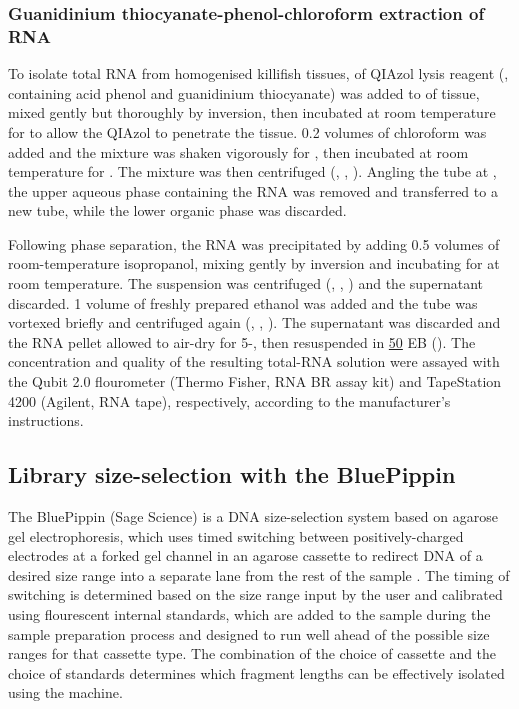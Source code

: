 \subsubsection{Guanidinium thiocyanate-phenol-chloroform extraction of RNA}
\label{sec:methods_molec_standard_qiazol}


To isolate total RNA from homogenised killifish tissues,  of QIAzol lysis reagent (, containing acid phenol and guanidinium thiocyanate) was added to  of tissue, mixed gently but thoroughly by inversion, then incubated at room temperature for  to allow the QIAzol to penetrate the tissue. 0.2 volumes of chloroform was added and the mixture was shaken vigorously for , then incubated at room temperature for . The mixture was then centrifuged (, , ). Angling the tube at , the upper aqueous phase containing the RNA was removed and transferred to a new tube, while the lower organic phase was discarded.

Following phase separation, the RNA was precipitated by adding 0.5 volumes of room-temperature isopropanol, mixing gently by inversion and incubating for  at room temperature. The suspension was centrifuged (, , ) and the supernatant discarded. 1 volume of freshly prepared  ethanol was added and the tube was vortexed briefly and centrifuged again (, , ). The supernatant was discarded and the RNA pellet allowed to air-dry for 5-, then resuspended in \ul{50} EB (). The concentration and quality of the resulting total-RNA solution were assayed with the Qubit 2.0 flourometer (Thermo Fisher, RNA BR assay kit) and TapeStation 4200 (Agilent, RNA tape), respectively, according to the manufacturer's instructions.

\subsection{Library size-selection with the BluePippin}
\label{sec:methods_molec_standard_bluepippin}

The BluePippin (Sage Science) is a DNA size-selection system based on agarose gel electrophoresis, which uses timed switching between positively-charged electrodes at a forked gel channel in an agarose cassette to redirect DNA of a desired size range into a separate lane from the rest of the sample \parencite{sage2016bluepippin}. The timing of switching is determined based on the size range input by the user and calibrated using flourescent internal standards, which are added to the sample during the sample preparation process and designed to run well ahead of the possible size ranges for that cassette type. The combination of the choice of cassette and the choice of standards determines which fragment lengths can be effectively isolated using the machine.

